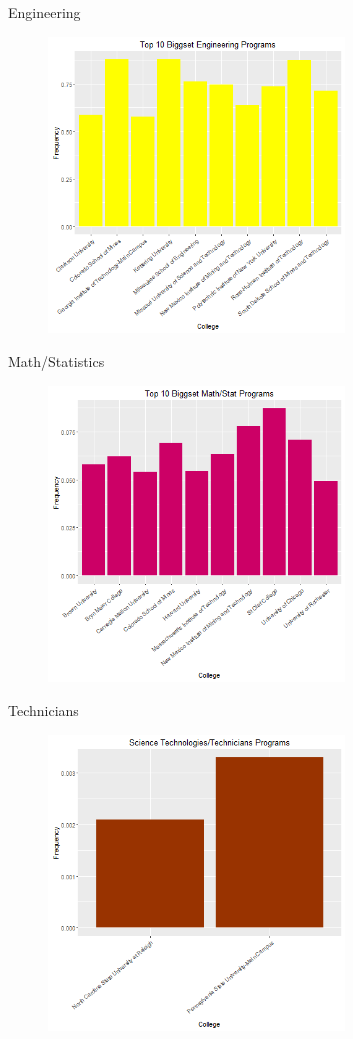 \documentclass{article}
\begin{document}
Engineering
\begin{figure}[H]
\includegraphics[width=0.7\textwidth]{../images/biggestEngineering.png}
\end{figure}


Math/Statistics
\begin{figure}[H]
\includegraphics[width=0.7\textwidth]{../images/biggestMathStat.png}
\end{figure}


Technicians
\begin{figure}[H]
\includegraphics[width=0.7\textwidth]{../images/biggestTechnicians.png}
\end{figure}
\end{document}
